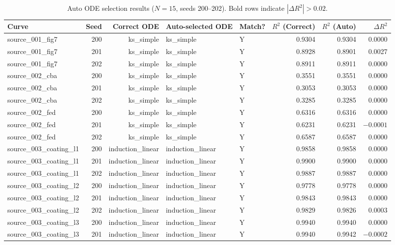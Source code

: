 \documentclass{article}
\begin{document}
\begin{table}[htbp]
\centering
\caption{Auto ODE selection results ($N=15$, seeds 200--202). Bold rows indicate $|\Delta R^2| > 0.02$.}
\label{tab:s1}
\begin{tabular}{@{}p{3.0cm}rrp{2.8cm}p{2.8cm}rrr@{}}
\toprule
Curve & Seed & Correct ODE & Auto-selected ODE & Match? & $R^2$ (Correct) & $R^2$ (Auto) & $\Delta R^2$ \\
\midrule
source\_001\_fig7 & 200 & ks\_simple & ks\_simple & Y & 0.9304 & 0.9304 & 0.0000 \\
source\_001\_fig7 & 201 & ks\_simple & ks\_simple & Y & 0.8928 & 0.8901 & 0.0027 \\
source\_001\_fig7 & 202 & ks\_simple & ks\_simple & Y & 0.8911 & 0.8911 & 0.0000 \\
source\_002\_cba  & 200 & ks\_simple & ks\_simple & Y & 0.3551 & 0.3551 & 0.0000 \\
source\_002\_cba  & 201 & ks\_simple & ks\_simple & Y & 0.3053 & 0.3053 & 0.0000 \\
source\_002\_cba  & 202 & ks\_simple & ks\_simple & Y & 0.3285 & 0.3285 & 0.0000 \\
source\_002\_fed  & 200 & ks\_simple & ks\_simple & Y & 0.6316 & 0.6316 & 0.0000 \\
source\_002\_fed  & 201 & ks\_simple & ks\_simple & Y & 0.6231 & 0.6231 & $-0.0001$ \\
source\_002\_fed  & 202 & ks\_simple & ks\_simple & Y & 0.6587 & 0.6587 & 0.0000 \\
source\_003\_coating\_l1 & 200 & induction\_linear & induction\_linear & Y & 0.9858 & 0.9858 & 0.0000 \\
source\_003\_coating\_l1 & 201 & induction\_linear & induction\_linear & Y & 0.9900 & 0.9900 & 0.0000 \\
source\_003\_coating\_l1 & 202 & induction\_linear & induction\_linear & Y & 0.9887 & 0.9887 & 0.0000 \\
source\_003\_coating\_l2 & 200 & induction\_linear & induction\_linear & Y & 0.9778 & 0.9778 & 0.0000 \\
source\_003\_coating\_l2 & 201 & induction\_linear & induction\_linear & Y & 0.9843 & 0.9843 & 0.0000 \\
source\_003\_coating\_l2 & 202 & induction\_linear & induction\_linear & Y & 0.9829 & 0.9826 & 0.0003 \\
source\_003\_coating\_l3 & 200 & induction\_linear & induction\_linear & Y & 0.9940 & 0.9940 & 0.0000 \\
source\_003\_coating\_l3 & 201 & induction\_linear & induction\_linear & Y & 0.9940 & 0.9942 & $-0.0002$ \\

\end{tabular}
\end{table}
\end{document}
